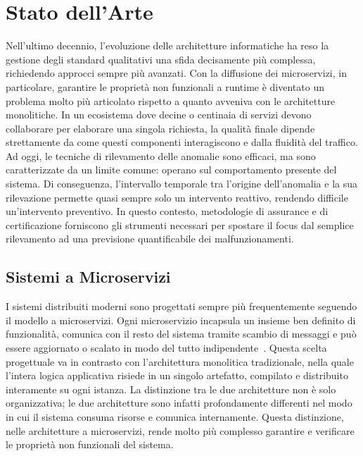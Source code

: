 
\chapter{Stato dell'Arte}
\label{chap:stato_arte}

Nell'ultimo decennio, l'evoluzione delle architetture informatiche ha reso la gestione degli 
standard qualitativi una sfida decisamente più complessa, richiedendo approcci sempre più avanzati.
Con la diffusione dei microservizi, in particolare, garantire le proprietà non funzionali
a runtime è diventato un problema molto più articolato rispetto a quanto avveniva con le 
architetture monolitiche. In un ecosistema dove decine o centinaia di servizi devono collaborare 
per elaborare una singola richiesta, la qualità finale dipende strettamente da come questi 
componenti interagiscono e dalla fluidità del traffico. Ad oggi, le tecniche di rilevamento 
delle anomalie sono efficaci, ma sono caratterizzate da un limite comune: operano sul 
comportamento presente del sistema. Di conseguenza, l'intervallo temporale tra l'origine 
dell'anomalia e la sua rilevazione permette quasi sempre solo un intervento reattivo, 
rendendo difficile un'intervento preventivo. In questo contesto, 
metodologie di assurance e di certificazione forniscono gli strumenti necessari per spostare il focus 
dal semplice rilevamento ad una previsione quantificabile dei malfunzionamenti.

\section{Sistemi a Microservizi}
\label{sec:microservizi}

I sistemi distribuiti moderni sono progettati sempre più frequentemente seguendo il modello
a microservizi. Ogni microservizio incapsula un insieme ben definito di funzionalità, comunica 
con il resto del sistema tramite scambio di messaggi e può essere aggiornato o scalato in modo del tutto 
indipendente~\cite{dragoni2017}. Questa scelta progettuale va in contrasto con l'architettura monolitica 
tradizionale, nella quale l'intera logica applicativa risiede in un singolo artefatto, compilato 
e distribuito interamente su ogni istanza. La distinzione tra le due architetture non è solo 
organizzativa; le due architetture sono infatti profondamente differenti nel modo in cui il 
sistema consuma risorse e comunica internamente. Questa distinzione, nelle architetture a 
microservizi, rende molto più complesso garantire e verificare le proprietà non funzionali 
del sistema.

